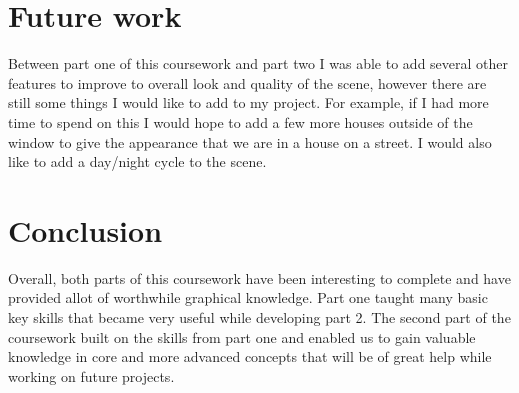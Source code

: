 \documentclass[10pt, a4paper]{article}
\begin{document}
\section{Future work}
Between part one of this coursework and part two I was able to add several other features to improve to overall look and quality of the scene, however there are still some things
I would like to add to my project. For example, if I had more time to spend on this I would hope to add a few more houses outside of the window to give the appearance that we are in a house on a street.
I would also like to add a day/night cycle to the scene.
\section{Conclusion}

Overall, both parts of this coursework have been interesting to complete and have provided allot of worthwhile graphical knowledge. Part one taught many basic key skills that became very useful while developing part 2. The second part of the coursework built on the skills from part one and enabled us to gain valuable knowledge in core and more advanced concepts that will be of great help while working on future projects.  	


		
\end{document}
